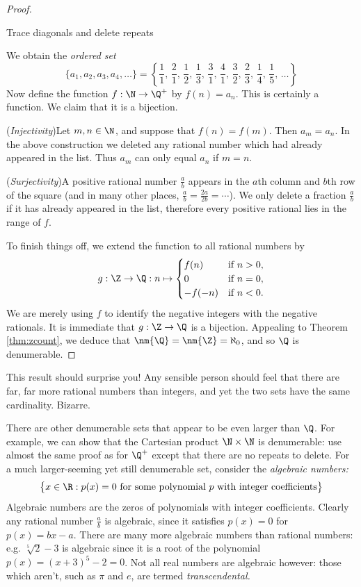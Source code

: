 \begin{proof}
\begin{center}
\begin{minipage}{0.38\textwidth}
			Trace diagonals and delete repeats
		\end{minipage}
	\end{center}
	We obtain the \emph{ordered set}
	\[
		\{a_1,a_2,a_3,a_4,\ldots\}=\left\{{\frac 11,\,\frac 21,\,\frac 12,\,\frac 13,\,\frac 31,\,\frac 41,\,\frac 32,\,\frac 23,\,\frac 14,\,\frac 15,\,\ldots}\right\}
	\]
	Now define the function $f:\N\to\Q^+$ by $f(n)=a_n$. This is certainly a function. We claim that it is a bijection.\par
	
	(\emph{Injectivity})\quad Let $m,n\in\N$, and suppose that $f(n)=f(m)$. Then $a_m=a_n$. In the above construction we deleted any rational number which had already appeared in the list. Thus $a_m$ can only equal $a_n$ if $m=n$.\par
	
	(\emph{Surjectivity})\quad A positive rational number $\frac ab$ appears in the $a$th column and $b$th row of the square (and in many other places, $\frac ab=\frac{2a}{2b}=\cdots$). We only delete a fraction $\frac ab$ if it has already appeared in the list, therefore every positive rational lies in the range of $f$.\par
	
	To finish things off, we extend the function to all rational numbers by
	\[
		g:\Z\to\Q:n\mapsto
		\begin{cases}
			f(n)&\text{if }n>0,\\
			0&\text{if }n=0,\\
			-f(-n)&\text{if }n<0.
		\end{cases}
	\]
	We are merely using $f$ to identify the negative integers with the negative rationals. It is immediate that $g:\Z\to\Q$ is a bijection. Appealing to Theorem \ref{thm:zcount}, we deduce that $\nm{\Q}=\nm{\Z}=\aleph_0$, and so $\Q$ is denumerable.
\end{proof}

This result should surprise you! Any sensible person should feel that there are far, far more rational numbers than integers, and yet the two sets have the same cardinality. Bizarre.\par

There are other denumerable sets that appear to be even larger than $\Q$. For example, we can show that the Cartesian product $\N\times\N$ is denumerable: use almost the same proof as for $\Q^+$ except that there are no repeats to delete. For a much larger-seeming yet still denumerable set, consider the \emph{algebraic numbers:}
\[
	\big\{x\in\R:p(x)=0\text{ for some polynomial $p$ with integer coefficients}\big\}
\]
Algebraic numbers are the zeros of polynomials with integer coefficients. Clearly any rational number $\frac ab$ is algebraic, since it satisfies $p(x)=0$ for $p(x)=bx-a$. There are many more algebraic numbers than rational numbers: e.g. $\sqrt[5]{2}-3$ is algebraic since it is a root of the polynomial $p(x)=(x+3)^5-2=0$. Not all real numbers are algebraic however: those which aren't, such as $\pi$ and $e$, are termed \emph{transcendental.}


